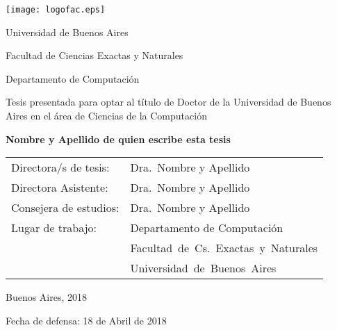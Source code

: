 \thispagestyle{empty}

\begin{center}

\texttt{[image: logofac.eps]}

\medskip
Universidad de Buenos Aires

Facultad de Ciencias Exactas y Naturales

Departamento de Computación


\vspace{1cm}

 

\textbf{\Large \thesisTitleSpanish}

\vspace{1cm}

Tesis presentada para optar al título de Doctor de la Universidad de Buenos Aires
en el área de Ciencias de la Computación

\vspace{.5cm}

\textbf{Nombre y Apellido de quien escribe esta tesis}

\end{center}


\vspace{.5cm}

{\footnotesize \centering
\begin{tabular}{ll}
\noindent Directora/s de tesis: & Dra.\ Nombre y Apellido\\

\noindent Directora Asistente: & Dra.\ Nombre y Apellido \\

\noindent Consejera de estudios: & Dra.\ Nombre y Apellido \\

\noindent Lugar de trabajo: & Departamento de Computación\\ 
\noindent & Facultad\ de\ Cs.\ Exactas\ y\ Naturales\\
\noindent & Universidad\ de\ Buenos\ Aires\\
\end{tabular}
}


\vspace{1cm}
Buenos Aires, 2018

Fecha de defensa: 18 de Abril de 2018
\newpage

